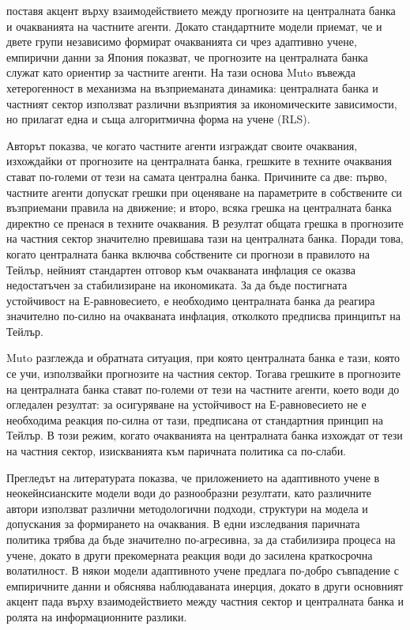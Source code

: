 \textcite{MUTO201152} поставя акцент върху взаимодействието между прогнозите на централната банка и очакванията на частните агенти. Докато стандартните модели приемат, че и двете групи независимо формират очакванията си чрез адаптивно учене, емпирични данни за Япония показват, че прогнозите на централната банка служат като ориентир за частните агенти. На тази основа Muto въвежда хетерогенност в механизма на възприеманата динамика: централната банка и частният сектор използват различни възприятия за икономическите зависимости, но прилагат една и съща алгоритмична форма на учене (RLS).

Авторът показва, че когато частните агенти изграждат своите очаквания, изхождайки от прогнозите на централната банка, грешките в техните очаквания стават по-големи от тези на самата централна банка. Причините са две: първо, частните агенти допускат грешки при оценяване на параметрите в собствените си възприемани правила на движение; и второ, всяка грешка на централната банка директно се пренася в техните очаквания. В резултат общата грешка в прогнозите на частния сектор значително превишава тази на централната банка. Поради това, когато централната банка включва собствените си прогнози в правилото на Тейлър, нейният стандартен отговор към очакваната инфлация се оказва недостатъчен за стабилизиране на икономиката. За да бъде постигната устойчивост на Е-равновесието, е необходимо централната банка да реагира значително по-силно на очакваната инфлация, отколкото предписва принципът на Тейлър.

Muto разглежда и обратната ситуация, при която централната банка е тази, която се учи, използвайки прогнозите на частния сектор. Тогава грешките в прогнозите на централната банка стават по-големи от тези на частните агенти, което води до огледален резултат: за осигуряване на устойчивост на Е-равновесието не е необходима реакция по-силна от тази, предписана от стандартния принцип на Тейлър. В този режим, когато очакванията на централната банка изхождат от тези на частния сектор, изискванията към паричната политика са по-слаби.

Прегледът на литературата показва, че приложението на адаптивното учене в неокейнсианските модели води до разнообразни резултати, като различните автори използват различни методологични подходи, структури на модела и допускания за формирането на очаквания. В едни изследвания паричната политика трябва да бъде значително по-агресивна, за да стабилизира процеса на учене, докато в други прекомерната реакция води до засилена краткосрочна волатилност. В някои модели адаптивното учене предлага по-добро съвпадение с емпиричните данни и обяснява наблюдаваната инерция, докато в други основният акцент пада върху взаимодействието между частния сектор и централната банка и ролята на информационните разлики.

